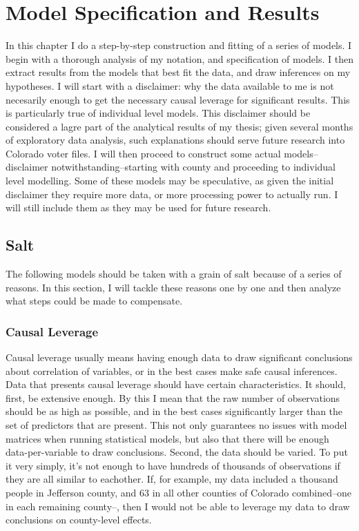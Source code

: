 \documentclass[12pt,twoside]{reedthesis}
\begin{document}
  \chapter{Model Specification and
  Results}\label{model-specification-and-results}
  
  In this chapter I do a step-by-step construction and fitting of a series
  of models. I begin with a thorough analysis of my notation, and
  specification of models. I then extract results from the models that
  best fit the data, and draw inferences on my hypotheses. I will start
  with a disclaimer: why the data available to me is not necesarily enough
  to get the necessary causal leverage for significant results. This is
  particularly true of individual level models. This disclaimer should be
  considered a lagre part of the analytical results of my thesis; given
  several months of exploratory data analysis, such explanations should
  serve future research into Colorado voter files. I will then proceed to
  construct some actual models--disclaimer notwithstanding--starting with
  county and proceeding to individual level modelling. Some of these
  models may be speculative, as given the initial disclaimer they require
  more data, or more processing power to actually run. I will still
  include them as they may be used for future research.
  
  \section{Salt}\label{salt}
  
  The following models should be taken with a grain of salt because of a
  series of reasons. In this section, I will tackle these reasons one by
  one and then analyze what steps could be made to compensate.
  
  \subsection{Causal Leverage}\label{causal-leverage}
  
  Causal leverage usually means having enough data to draw significant
  conclusions about correlation of variables, or in the best cases make
  safe causal inferences. Data that presents causal leverage should have
  certain characteristics. It should, first, be extensive enough. By this
  I mean that the raw number of observations should be as high as
  possible, and in the best cases significantly larger than the set of
  predictors that are present. This not only guarantees no issues with
  model matrices when running statistical models, but also that there will
  be enough data-per-variable to draw conclusions. Second, the data should
  be varied. To put it very simply, it's not enough to have hundreds of
  thousands of observations if they are all similar to eachother. If, for
  example, my data included a thousand people in Jefferson county, and 63
  in all other counties of Colorado combined--one in each remaining
  county--, then I would not be able to leverage my data to draw
  conclusions on county-level effects.
  
\end{document}
